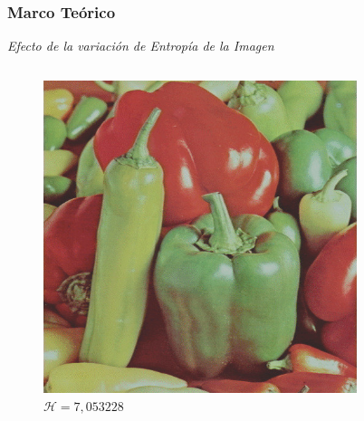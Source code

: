 \documentclass[usenames,dvipsnames]{beamer}
\begin{document}
\begin{frame} 
\frametitle{Marco Teórico} 
\begin{exampleblock}{\textit{Efecto de la variación de Entropía de la Imagen}}

\end{exampleblock}

\centering
\begin{columns}[onlytextwidth]
\begin{column}{.45\textwidth}
\begin{figure}
  \includegraphics[width=\textwidth]{graphics/peppers_color_lc.jpg}
  \caption{$\mathscr{H}=7,053228$}
\end{figure}
\end{column}
\hfill
\begin{column}{.45\textwidth}
		\begin{figure}

\end{figure}
\end{column}
\end{columns}
\end{frame}
\end{document}

